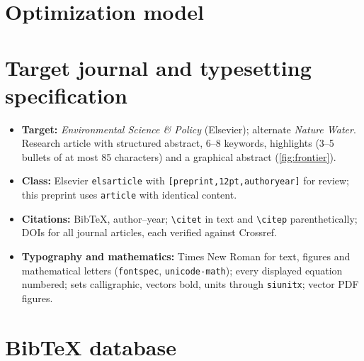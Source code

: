 \documentclass[11pt]{article}
\begin{document}
\section{Optimization model}\label{app:opt}


\section{Target journal and typesetting specification}\label{app:journal}
\begin{itemize}[nosep]
\item \textbf{Target:} \emph{Environmental Science \& Policy} (Elsevier); alternate \emph{Nature Water}.
Research article with structured abstract, 6--8 keywords, highlights (3--5 bullets of at most 85
characters) and a graphical abstract (\cref{fig:frontier}).
\item \textbf{Class:} Elsevier \texttt{elsarticle} with \texttt{[preprint,12pt,authoryear]} for
review; this preprint uses \texttt{article} with identical content.
\item \textbf{Citations:} BibTeX, author--year; \verb|\citet| in text and \verb|\citep|
parenthetically; DOIs for all journal articles, each verified against Crossref.
\item \textbf{Typography and mathematics:} Times New Roman for text, figures and mathematical
letters (\texttt{fontspec}, \texttt{unicode-math}); every displayed equation numbered; sets
calligraphic, vectors bold, units through \texttt{siunitx}; vector PDF figures.
\end{itemize}

\section{BibTeX database}\label{app:bib}

\end{document}
